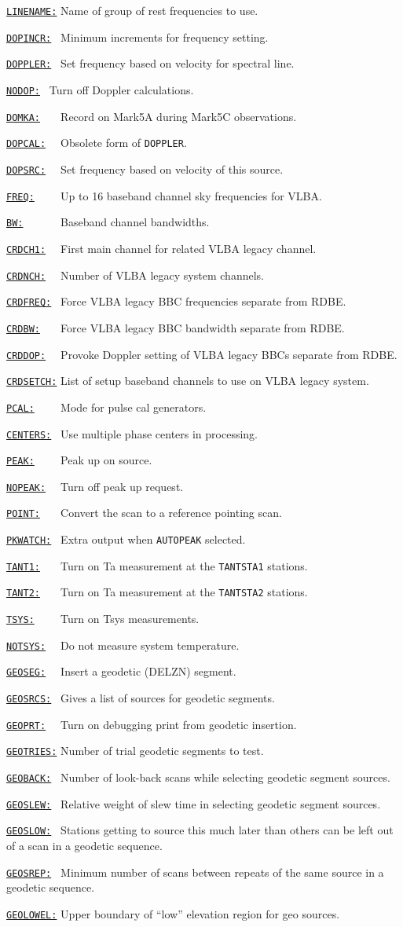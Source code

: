 \documentclass{report}
\newcommand{\htlm}[2]%
{\item
  \hyperref[MP:#1]{{\tt #1:}}{\tt #2}%
}
\newcommand{\htln}[3]%
{\item
  \hyperref[MP:#2]{{\tt #1:}}{\tt #3}%
}
\begin{document}
\begin{list}{}{\parsep 0em  \itemsep 0em }
\htlm{LINENAME}{} Name of group of rest frequencies to use.
\htlm{DOPINCR}{~} Minimum increments for frequency setting.
\htlm{DOPPLER}{~} Set frequency based on velocity for
                        spectral line.
\htln{NODOP}{DOPPLER}{~} Turn off Doppler calculations.
\htlm{DOMKA}{~~~} Record on Mark5A during Mark5C observations.
\htlm{DOPCAL}{~~} Obsolete form of {\tt DOPPLER}.
\htlm{DOPSRC}{~~} Set frequency based on velocity of this source.
\htlm{FREQ}{~~~~} Up to 16 baseband channel sky frequencies for
                        VLBA.
\htlm{BW}{~~~~~~}       Baseband channel bandwidths.
\htlm{CRDCH1}{~~} First main channel for related VLBA legacy channel.
\htlm{CRDNCH}{~~} Number of VLBA legacy system channels.
\htlm{CRDFREQ}{~} Force VLBA legacy BBC frequencies separate from RDBE.
\htlm{CRDBW}{~~~} Force VLBA legacy BBC bandwidth separate from RDBE.
\htln{CRDDOP}{CRDDOP}{~~} Provoke Doppler setting of VLBA legacy 
                         BBCs separate from RDBE.
\htlm{CRDSETCH}{} List of setup baseband channels to use on VLBA legacy 
                         system.
\htlm{PCAL}{~~~~} Mode for pulse cal generators.
\htlm{CENTERS}{~} Use multiple phase centers in processing.
\htlm{PEAK}{~~~~} Peak up on source.
\htln{NOPEAK}{PEAK}{~~} Turn off peak up request.
\htlm{POINT}{~~~} Convert the scan to a reference pointing scan.
\htlm{PKWATCH}{~} Extra output when {\tt AUTOPEAK} selected.
\htlm{TANT1}{~~~} Turn on Ta measurement at the {\tt TANTSTA1}
                         stations.
\htln{TANT2}{TANT1}{~~~} Turn on Ta measurement at the {\tt TANTSTA2}
                        stations.
\htlm{TSYS}{~~~~} Turn on Tsys measurements.
\htln{NOTSYS}{TSYS}{~~} Do not measure system temperature.
\htlm{GEOSEG}{~~} Insert a geodetic (DELZN) segment.
\htlm{GEOSRCS}{~} Gives a list of sources for geodetic segments.
\htlm{GEOPRT}{~~} Turn on debugging print from geodetic insertion.
\htlm{GEOTRIES}{} Number of trial geodetic segments to test.
\htlm{GEOBACK}{~} Number of look-back scans while selecting geodetic
                     segment sources.
\htlm{GEOSLEW}{~} Relative weight of slew time in selecting geodetic
                     segment sources.
\htlm{GEOSLOW}{~} Stations getting to source this much later than others
                     can be left out of a scan in a geodetic sequence.
\htlm{GEOSREP}{~} Minimum number of scans between repeats of the same
                     source in a geodetic sequence.
\htlm{GEOLOWEL}{} Upper boundary of ``low'' elevation region for geo sources.

\end{list}
\end{document}

